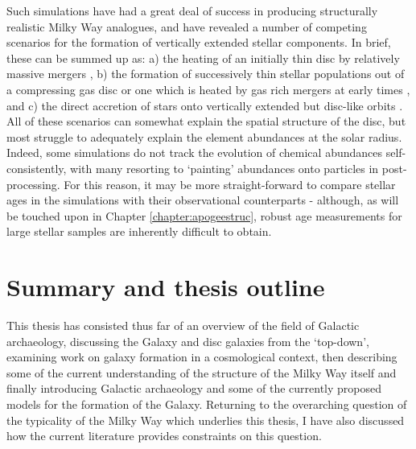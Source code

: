  Such simulations have had a great deal of success in producing structurally realistic Milky Way analogues, and have revealed a number of competing scenarios for the formation of vertically extended stellar components. In brief, these can be summed up as: a) the heating of an initially thin disc by relatively massive mergers \citep[e.g.][]{2008MNRAS.391.1806V,2009ApJ...700.1896K}, b) the formation of successively thin stellar populations out of a compressing gas disc \citep[e.g.][]{2013ApJ...773...43B,2017arXiv170901040N} or one which is heated by gas rich mergers at early times \citep[e.g.][]{2004ApJ...612..894B,2013A&A...558A...9M}, and c) the direct accretion of stars onto vertically extended but disc-like orbits \citep[e.g.][]{2003ApJ...597...21A}. All of these scenarios can somewhat explain the spatial structure of the disc, but most struggle to adequately explain the element abundances at the solar radius. Indeed, some simulations do not track the evolution of chemical abundances self-consistently, with many resorting to `painting' abundances onto particles in post-processing. For this reason, it may be more straight-forward to compare stellar ages in the simulations with their observational counterparts - although, as will be touched upon in Chapter \ref{chapter:apogeestruc}, robust age measurements for large stellar samples are inherently difficult to obtain.
 
\section{Summary and thesis outline}

This thesis has consisted thus far of an overview of the field of Galactic archaeology, discussing the Galaxy and disc galaxies from the `top-down', examining work on galaxy formation in a cosmological context, then describing some of the current understanding of the structure of the Milky Way itself and finally introducing Galactic archaeology and some of the currently proposed models for the formation of the Galaxy. Returning to the overarching question of the typicality of the Milky Way which underlies this thesis, I have also discussed how the current literature provides constraints on this question. 

